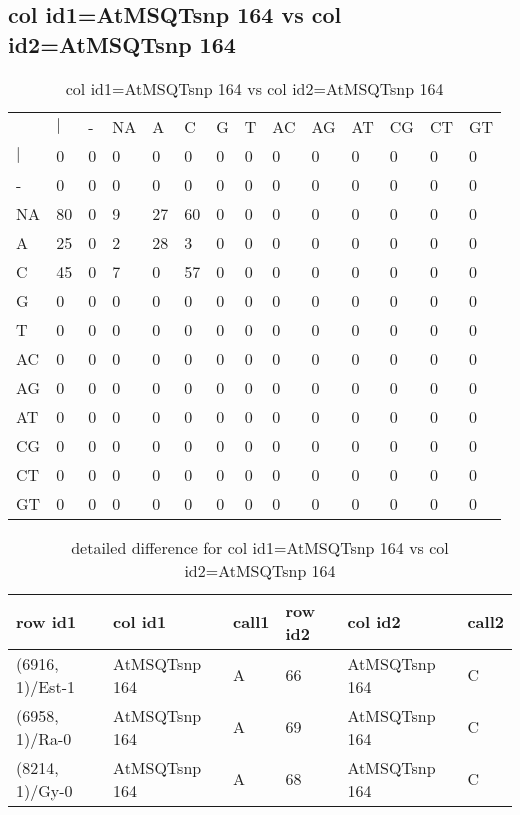 \subsection{col id1=AtMSQTsnp 164 vs col id2=AtMSQTsnp 164}
\begin{center}
\begin{longtable}{|l|l|l|l|l|l|l|l|l|l|l|l|l|l|}
\caption{col id1=AtMSQTsnp 164 vs col id2=AtMSQTsnp 164} \label{table_dm740}\\
\hline
\\
\hline
&$|$&-&NA&A&C&G&T&AC&AG&AT&CG&CT&GT\\
$|$&0&0&0&0&0&0&0&0&0&0&0&0&0\\
-&0&0&0&0&0&0&0&0&0&0&0&0&0\\
NA&80&0&9&27&60&0&0&0&0&0&0&0&0\\
A&25&0&2&28&3&0&0&0&0&0&0&0&0\\
C&45&0&7&0&57&0&0&0&0&0&0&0&0\\
G&0&0&0&0&0&0&0&0&0&0&0&0&0\\
T&0&0&0&0&0&0&0&0&0&0&0&0&0\\
AC&0&0&0&0&0&0&0&0&0&0&0&0&0\\
AG&0&0&0&0&0&0&0&0&0&0&0&0&0\\
AT&0&0&0&0&0&0&0&0&0&0&0&0&0\\
CG&0&0&0&0&0&0&0&0&0&0&0&0&0\\
CT&0&0&0&0&0&0&0&0&0&0&0&0&0\\
GT&0&0&0&0&0&0&0&0&0&0&0&0&0\\
\hline
\end{longtable}
\end{center}

\begin{center}
\begin{longtable}{|l|l|l|l|l|l|}
\caption{detailed difference for col id1=AtMSQTsnp 164 vs col id2=AtMSQTsnp 164} \label{table_dm741}\\
\hline
row id1&col id1&call1&row id2&col id2&call2\\
\hline
(6916, 1)/Est-1&AtMSQTsnp 164&A&66&AtMSQTsnp 164&C\\
(6958, 1)/Ra-0&AtMSQTsnp 164&A&69&AtMSQTsnp 164&C\\
(8214, 1)/Gy-0&AtMSQTsnp 164&A&68&AtMSQTsnp 164&C\\
\hline
\end{longtable}
\end{center}

